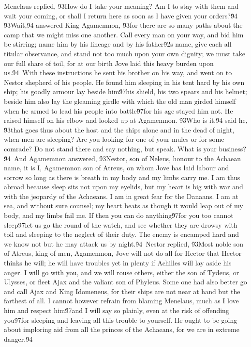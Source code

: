 {Menelaus replied, \'93How do I take your meaning? Am I to stay with them and wait your coming, or shall I return here as soon as I have given your orders?\'94 \'93Wait,\'94 answered King Agamemnon, \'93for there are so many paths about the camp that we might miss one another. Call every man on your way, and bid him be stirring; name him by his lineage and by his father\'92s name, give each all titular observance, and stand not too much upon your own dignity; we must take our full share of toil, for at our birth Jove laid this heavy burden upon us.\'94\
With these instructions he sent his brother on his way, and went on to Nestor shepherd of his people. He found him sleeping in his tent hard by his own ship; his goodly armour lay beside him\'97his shield, his two spears and his helmet; beside him also lay the gleaming girdle with which the old man girded himself when he armed to lead his people into battle\'97for his age stayed him not. He raised himself on his elbow and looked up at Agamemnon. \'93Who is it,\'94 said he, \'93that goes thus about the host and the ships alone and in the dead of night, when men are sleeping? Are you looking for one of your mules or for some comrade? Do not stand there and say nothing, but speak. What is your business?\'94\
And Agamemnon answered, \'93Nestor, son of Neleus, honour to the Achaean name, it is I, Agamemnon son of Atreus, on whom Jove has laid labour and sorrow so long as there is breath in my body and my limbs carry me. I am thus abroad because sleep sits not upon my eyelids, but my heart is big with war and with the jeopardy of the Achaeans. I am in great fear for the Danaans. I am at sea, and without sure counsel; my heart beats as though it would leap out of my body, and my limbs fail me. If then you can do anything\'97for you too cannot sleep\'97let us go the round of the watch, and see whether they are drowsy with toil and sleeping to the neglect of their duty. The enemy is encamped hard and we know not but he may attack us by night.\'94\
Nestor replied, \'93Most noble son of Atreus, king of men, Agamemnon, Jove will not do all for Hector that Hector thinks he will; he will have troubles yet in plenty if Achilles will lay aside his anger. I will go with you, and we will rouse others, either the son of Tydeus, or Ulysses, or fleet Ajax and the valiant son of Phyleus. Some one had also better go and call Ajax and King Idomeneus, for their ships are not near at hand but the farthest of all. I cannot however refrain from blaming Menelaus, much as I love him and respect him\'97and I will say so plainly, even at the risk of offending you\'97for sleeping and leaving all this trouble to yourself. He ought to be going about imploring aid from all the princes of the Achaeans, for we are in extreme danger.\'94\
}
